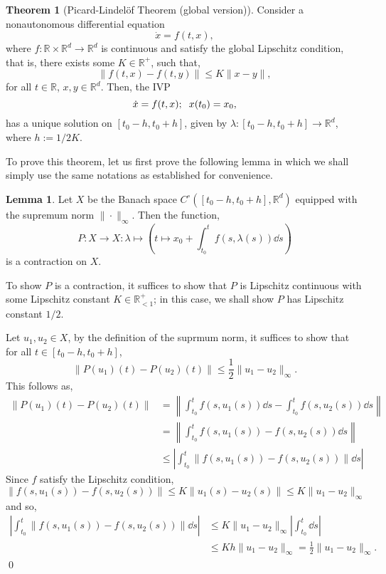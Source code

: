 \documentclass[
]{article}
\theoremstyle{definition}
\newtheorem{theorem}{Theorem}
\theoremstyle{definition}
\newtheorem{lemma}{Lemma}[section]
\begin{document}
\begin{theorem}[Picard-Lindelöf Theorem (global version)]
  Consider a nonautonomous differential equation 
  \[\dot x = f(t, x),\]
  where \(f : \mathbb{R} \times \mathbb{R}^d \to \mathbb{R}^d\) is continuous 
  and satisfy the global Lipschitz condition, that is, there exists some 
  \(K \in \mathbb{R}^+\), such that,
  \[\| f(t, x) - f(t, y)\| \le K \|x - y\|,\]
  for all \(t \in \mathbb{R}\), \(x, y \in \mathbb{R}^d\). Then, the IVP 
  \[\dot x = f(t, x); \hspace{2mm} x(t_0) = x_0,\]
  has a unique solution on \([t_0 - h, t_0 + h]\), given by 
  \(\lambda : [t_0 - h, t_0 + h] \to \mathbb{R}^d\), where \(h := 1 / 2K\).
\end{theorem}

To prove this theorem, let us first prove the following lemma in which
we shall simply use the same notations as established for convenience.

\begin{lemma}
  Let \(X\) be the Banach space \(C^\circ([t_0 - h, t_0 + h], \mathbb{R}^d)\) 
  equipped with the supremum norm \(\|\cdot\|_\infty\). Then the function,
  \[P : X \to X : \lambda \mapsto \left(t \mapsto x_0 + \int_{t_0}^t f(s, \lambda(s)) \dd s\right)\]
  is a contraction on \(X\).
\end{lemma}
\proof

To show \(P\) is a contraction, it suffices to show that \(P\) is
Lipschitz continuous with some Lipschitz constant
\(K \in \mathbb{R}_{< 1}^+\); in this case, we shall show \(P\) has
Lipschitz constant \(1 / 2\).

Let \(u_1, u_2 \in X\), by the definition of the suprmum norm, it
suffices to show that for all \(t \in [t_0 - h, t_0 + h]\),
\[\|P(u_1)(t) - P(u_2)(t)\| \le \frac{1}{2} \|u_1 - u_2\|_\infty.\] This
follows as, \[\begin{split}
    \|P(u_1)(t) - P(u_2)(t)\| 
    & = \left\|\int_{t_0}^t f(s, u_1(s)) \dd s - \int_{t_0}^t f(s, u_2(s)) \dd s\right\|\\
    & = \left\|\int_{t_0}^t f(s, u_1(s)) - f(s, u_2(s)) \dd s \right\|\\
    & \le \left|\int_{t_0}^t \| f(s, u_1(s)) - f(s, u_2(s)) \| \dd s\right|
  \end{split}\] Since \(f\) satisfy the Lipschitz condition,
\(\|f(s, u_1(s)) - f(s, u_2(s))\| \le K \|u_1(s) - u_2(s)\| \le K\|u_1 - u_2\|_\infty\)
and so, \[\begin{split}
     \left|\int_{t_0}^t \| f(s, u_1(s)) - f(s, u_2(s)) \| \dd s\right|
      & \le K\|u_1 - u_2\|_\infty \left|\int_{t_0}^t \dd s\right|\\
      & \le K h \|u_1 - u_2\|_\infty = \frac{1}{2} \|u_1 - u_2\|_\infty.
  \end{split}\] \qed
\end{document}
